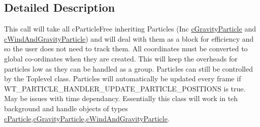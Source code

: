 \subsection{Detailed Description}
This call will take all cParticleFree inheriting Particles (Inc \hyperlink{classc_gravity_particle}{cGravityParticle} and \hyperlink{classc_wind_and_gravity_particle}{cWindAndGravityParticle}) and will deal with them as a block for efficiency and so the user does not need to track them. All coordinates must be converted to global co-\/ordinates when they are created. This will keep the overheads for particles low as they can be handled as a group. Particles can still be controlled by the Toplevel class. Particles will automatically be updated every frame if WT\_\-PARTICLE\_\-HANDLER\_\-UPDATE\_\-PARTICLE\_\-POSITIONS is true. May be issues with time dependancy. Essentially this class will work in teh background and handle objects of types \hyperlink{classc_particle}{cParticle},\hyperlink{classc_gravity_particle}{cGravityParticle},\hyperlink{classc_wind_and_gravity_particle}{cWindAndGravityParticle}. 